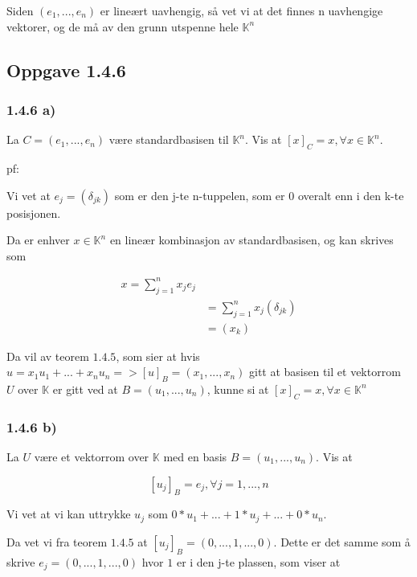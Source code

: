 \documentclass[11pt]{article}
\begin{document}
Siden $(e_1,...,e_n)$ er lineært uavhengig, så vet vi at det finnes n uavhengige vektorer, og de må av den grunn utspenne hele $\mathbb{K}^n$




\subsection{Oppgave 1.4.6}
\subsubsection{1.4.6 a)}

La $C = (e_1,..., e_n)$ være standardbasisen til $\mathbb{K}^n$. Vis at $[ x ]_C = x, \forall x \in \mathbb{K}^n$.

pf:

Vi vet at $e_j = (\delta_{jk})$ som er den j-te n-tuppelen, som er 0 overalt enn i den k-te posisjonen.

Da er enhver $x \in \mathbb{K}^n$ en lineær kombinasjon av standardbasisen, og kan skrives som

\begin{align*}
    x = \sum_{j=1}^{n} x_j e_j \\
    &= \sum_{j=1}^{n} x_j (\delta_{jk}) \\
    &= (x_k)
\end{align*}

\vspace{1em}

Da vil av teorem $1.4.5$, som sier at hvis $u = x_1 u_1+...+x_n u_n => [u]_B = (x_1,...,x_n)$ gitt at basisen til et vektorrom $U$ over $\mathbb{K}$ er gitt ved at $B=(u_1,...,u_n)$, kunne si at
$[x]_C = x,  \forall x \in \mathbb{K}^n$



\subsubsection{1.4.6 b)}

La $U$ være et vektorrom over $\mathbb{K}$ med en basis $B=(u_1,...,u_n)$. Vis at 

$$
[u_j]_B = e_j, \forall j =1,...,n
$$

Vi vet at vi kan uttrykke $u_j$ som $0 * u_1 + ... + 1 * u_j + ... + 0 * u_n$.

Da vet vi fra teorem $1.4.5$  at $[u_j]_B = (0,...,1,...,0)$. Dette er det samme som å skrive $e_j = (0,...,1,...,0)$ hvor $1$ er i den j-te plassen, som viser at
\end{document}
